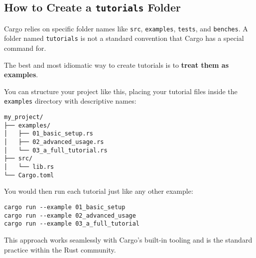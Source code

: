 \subsection{How to Create a \texttt{tutorials} Folder}
\label{subsec:tutorials_folder}

Cargo relies on specific folder names like \texttt{src}, \texttt{examples}, \texttt{tests}, and \texttt{benches}. A folder named \texttt{tutorials} is not a standard convention that Cargo has a special command for.

The best and most idiomatic way to create tutorials is to \textbf{treat them as examples}.

You can structure your project like this, placing your tutorial files inside the \texttt{examples} directory with descriptive names:

\begin{verbatim}
my_project/
├── examples/
│   ├── 01_basic_setup.rs
│   ├── 02_advanced_usage.rs
│   └── 03_a_full_tutorial.rs
├── src/
│   └── lib.rs
└── Cargo.toml
\end{verbatim}

You would then run each tutorial just like any other example:

\begin{verbatim}
cargo run --example 01_basic_setup
cargo run --example 02_advanced_usage
cargo run --example 03_a_full_tutorial
\end{verbatim}

This approach works seamlessly with Cargo's built-in tooling and is the standard practice within the Rust community.
